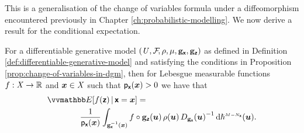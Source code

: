 This is a generalisation of the change of variables formula under a diffeomorphism encountered previously in Chapter \ref{ch:probabilistic-modelling}. We now derive a result for the conditional expectation.
\begin{proposition}\label{prop:conditional-expectations-in-dgm}
For a differentiable generative model $(\mathit{U},\mathcal{F}\kern-2pt,\rho,\mu,{\mathbf{g}}_{\boldsymbol{\mathsf{x}}},{\mathbf{g}}_{\boldsymbol{\mathsf{z}}})$ as defined in Definition \ref{def:differentiable-generative-model} and satisfying the conditions in Proposition \ref{prop:change-of-variables-in-dgm}, then for Lebesgue measurable functions $f : \mathit{X} \to \mathbb{R}$ and $\boldsymbol{x} \in \mathit{X}$ such that $\mathsf{p}_{\boldsymbol{\mathsf{x}}}(\boldsymbol{x}) > 0$ we have that
\begin{equation}\label{eq:cond-expectation-input-space}
\begin{split}
  &\expc{f(\rvct{z}) \gvn \rvct{x}=\vct{x}}
  =\,\\
  &\qquad\qquad
  \frac{1}{\pden{\rvct{x}}({\vct{x}})}
  \int_{\preimage{\genfunc_{\rvct{x}}}{\vct{x}}}
    f\circ\genfunc_{\rvct{z}}(\vct{u}) \, \rho(\vct{u}) \,
    \jacobproddet{\genfunc_{\rvct{x}}}{\vct{u}}^{-1}
  \,\dr\haum{M-N_{\rvct{x}}}(\vct{u}).
\end{split}
\end{equation}
\end{proposition}
